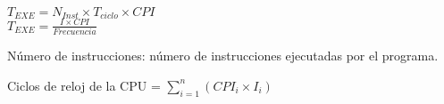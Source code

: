 \documentclass[12pt]{article}
\begin{document}
    \begin{spacing}{3.0} %
        \begin{center}  
            $T_{EXE} = N_{Inst} \times T_{ciclo} \times CPI$ \\
            $T_{EXE} = \displaystyle\frac{I \times CPI}{Frecuencia}$
        \end{center}
    \end{spacing}

    Número de instrucciones: número de instrucciones ejecutadas por el 
    programa.

      
      \begin{center}  
            Ciclos de reloj de la CPU = $\sum_{i=1}^{n}(CPI_i \times I_i)$
        \end{center}
\end{document}
